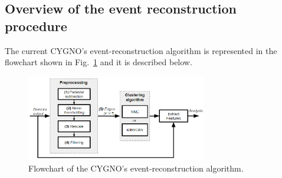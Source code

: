 \documentclass[a4paper,11pt]{article}
\begin{document}
\subsection{Overview of the event reconstruction procedure}

The current CYGNO's event-reconstruction algorithm is represented in the flowchart shown in Fig.~\ref{fig_algo} and it is described below.

\begin{figure}[ht]
\centering
\includegraphics[width=0.7\textwidth]{fluxgram_algorithm.PNG}
\caption{Flowchart of the CYGNO's event-reconstruction algorithm.}
\label{fig_algo}
\end{figure}
\end{document}
